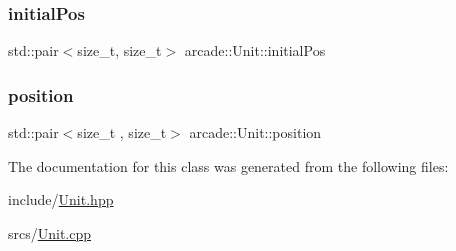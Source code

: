 \subsubsection{\texorpdfstring{initial\+Pos}{initialPos}}
{\footnotesize\ttfamily std\+::pair$<$size\+\_\+t, size\+\_\+t$>$ arcade\+::\+Unit\+::initial\+Pos\hspace{0.3cm}{\ttfamily [protected]}}

\mbox{\label{classarcade_1_1_unit_ab56f7df422277f97e7738cb4807fd62d}} 
\subsubsection{\texorpdfstring{position}{position}}
{\footnotesize\ttfamily std\+::pair$<$size\+\_\+t , size\+\_\+t$>$ arcade\+::\+Unit\+::position\hspace{0.3cm}{\ttfamily [protected]}}



The documentation for this class was generated from the following files\+:\begin{DoxyCompactItemize}
\item 
include/\hyperlink{_unit_8hpp}{Unit.\+hpp}\item 
srcs/\hyperlink{_unit_8cpp}{Unit.\+cpp}\end{DoxyCompactItemize}
